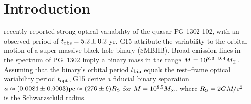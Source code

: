 


\section{Introduction}
\citet[][hereafter G15]{Graham+2015a} recently reported strong optical
variability of the quasar PG 1302-102, with an observed period of
$t_{\rm{obs}} = 5.2 \pm 0.2$ yr. G15 attribute the variability to the
orbital motion of a super-massive black hole binary (SMBHB). Broad
emission lines in the spectrum of PG~1302 imply a binary mass in the
range $M = 10^{8.3-9.4} {M_{\odot}}$. Assuming that the binary's orbital
period $t_{\rm bin}$ equals the rest--frame optical variability period
$t_{\rm opt}$, G15 derive a fiducial binary separation $a\approx
(0.0084 \pm 0.0003)\mbox{pc} \approx (276 \pm 9) R_{\rm{S}}$ for $M=10^{8.5}
{M_{\odot}}$, where $R_{\rm{S}} = 2GM/c^2$ is the Schwarzschild radius.

